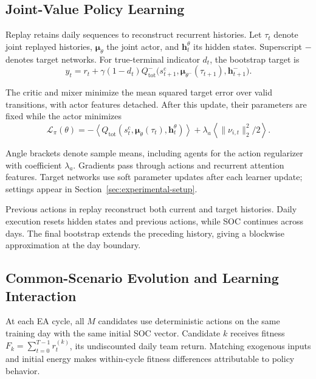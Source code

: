 \subsection{Joint-Value Policy Learning}
\label{sec:policy-learning}
\label{sec:facmac-learning}

Replay retains daily sequences to reconstruct recurrent histories.
Let $\tau_t$ denote joint replayed histories,
$\boldsymbol\mu_\theta$ the joint actor, and $\boldsymbol h_t^\theta$
its hidden states. Superscript $-$ denotes target networks.
For true-terminal indicator $d_t$, the bootstrap target is
\begin{equation}
 y_t=r_t+\gamma(1-d_t)Q_{\mathrm{tot}}^-
 \big(s_{t+1}^{\mathrm{c}},
      \boldsymbol\mu_{\theta^-}(\tau_{t+1}),\boldsymbol h_{t+1}^{-}\big).
 \label{eq:td-target}
\end{equation}

The critic and mixer minimize the mean squared target error over valid
transitions, with actor features detached. After this update, their
parameters are fixed while the actor minimizes
\begin{equation}
 \mathcal L_\pi(\theta)=
 -\left\langle Q_{\mathrm{tot}}
 (s_t^{\mathrm{c}},\boldsymbol\mu_\theta(\tau_t),\boldsymbol h_t^\theta)
 \right\rangle
 +\lambda_a\left\langle\|\nu_{i,t}\|_2^2/2\right\rangle.
 \label{eq:actor-loss}
\end{equation}

Angle brackets denote sample means, including agents for the action
regularizer with coefficient $\lambda_a$. Gradients pass through actions
and recurrent attention features. Target networks use soft parameter
updates after each learner update; settings appear in
Section~\ref{sec:experimental-setup}.

Previous actions in replay reconstruct both current and target histories.
Daily execution resets hidden states and previous actions, while SOC
continues across days. The final bootstrap extends the preceding history,
giving a blockwise approximation at the day boundary.

\subsection{Common-Scenario Evolution and Learning Interaction}
\label{sec:evolution}
\label{sec:hybrid-interaction}
\label{sec:training-procedure}

At each EA cycle, all $M$ candidates use deterministic actions on the same
training day with the same initial SOC vector. Candidate $k$ receives
fitness $F_k=\sum_{t=0}^{T-1}r_t^{(k)}$, its undiscounted daily team return.
Matching exogenous inputs and initial energy makes within-cycle fitness
differences attributable to policy behavior.

